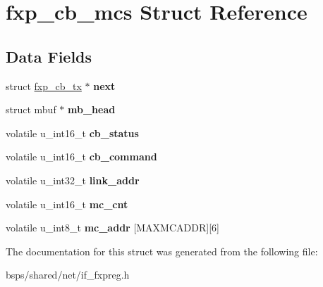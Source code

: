 \hypertarget{structfxp__cb__mcs}{}\section{fxp\+\_\+cb\+\_\+mcs Struct Reference}
\label{structfxp__cb__mcs}
\subsection*{Data Fields}
\begin{DoxyCompactItemize}
\item 
\mbox{\label{structfxp__cb__mcs_a7369a7260bae734d456e0405afed9808}} 
struct \mbox{\hyperlink{structfxp__cb__tx}{fxp\+\_\+cb\+\_\+tx}} $\ast$ {\bfseries next}
\item 
\mbox{\label{structfxp__cb__mcs_a5003899c08edf06827111330b0c4cf30}} 
struct mbuf $\ast$ {\bfseries mb\+\_\+head}
\item 
\mbox{\label{structfxp__cb__mcs_a6a960023738a85181bb9d4e543d00ac0}} 
volatile u\+\_\+int16\+\_\+t {\bfseries cb\+\_\+status}
\item 
\mbox{\label{structfxp__cb__mcs_a98d380f4abd85597f94e4ce33b114c4b}} 
volatile u\+\_\+int16\+\_\+t {\bfseries cb\+\_\+command}
\item 
\mbox{\label{structfxp__cb__mcs_ae23b4649795c0076b0389c199bc44927}} 
volatile u\+\_\+int32\+\_\+t {\bfseries link\+\_\+addr}
\item 
\mbox{\label{structfxp__cb__mcs_a6fd1986ab86a064fe6d6fd58efa7c69e}} 
volatile u\+\_\+int16\+\_\+t {\bfseries mc\+\_\+cnt}
\item 
\mbox{\label{structfxp__cb__mcs_ab2d78ae5b4d1c387630309cca9719258}} 
volatile u\+\_\+int8\+\_\+t {\bfseries mc\+\_\+addr} \mbox{[}M\+A\+X\+M\+C\+A\+D\+DR\mbox{]}\mbox{[}6\mbox{]}
\end{DoxyCompactItemize}


The documentation for this struct was generated from the following file\+:\begin{DoxyCompactItemize}
\item 
bsps/shared/net/if\+\_\+fxpreg.\+h\end{DoxyCompactItemize}
